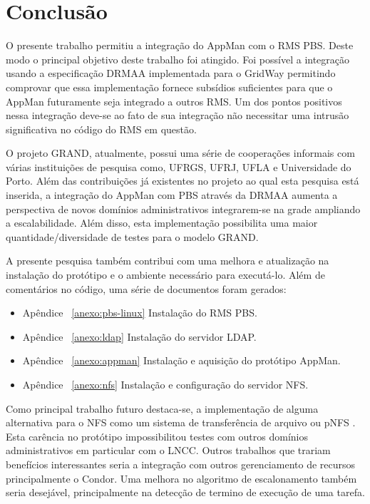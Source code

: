 \chapter{Conclusão}
\label{cap:conclusao}

O presente trabalho permitiu a integração do AppMan com o RMS PBS. Deste modo o principal objetivo deste trabalho foi atingido. Foi possível a integração usando a especificação DRMAA implementada para o GridWay permitindo comprovar que essa implementação fornece subsídios suficientes para que o AppMan futuramente seja integrado a outros RMS. Um dos pontos positivos nessa integração deve-se ao fato de sua integração não necessitar uma intrusão significativa no código do RMS em questão.  

O projeto GRAND, atualmente, possui uma série de cooperações informais com várias instituições de pesquisa como, UFRGS, UFRJ, UFLA e Universidade do Porto. Além das contribuições já existentes no projeto ao qual esta pesquisa está inserida, a integração do AppMan com PBS através da DRMAA aumenta a perspectiva de novos domínios administrativos integrarem-se na grade ampliando a escalabilidade. Além disso, esta implementação possibilita uma maior quantidade/diversidade de testes para o modelo GRAND. 

A presente pesquisa também contribui com uma melhora e atualização na instalação do protótipo e o ambiente necessário para executá-lo. Além de comentários no código, uma série de documentos foram gerados:

\begin{itemize}
	\item Apêndice ~\ref{anexo:pbs-linux} Instalação do RMS PBS.
	\item Apêndice ~\ref{anexo:ldap} Instalação do servidor LDAP.
	\item Apêndice ~\ref{anexo:appman} Instalação e aquisição do protótipo AppMan.
	\item Apêndice ~\ref{anexo:nfs} Instalação e configuração do servidor NFS.
\end{itemize}

Como principal trabalho futuro destaca-se, a implementação de alguma alternativa para o NFS como um sistema de transferência de arquivo ou pNFS \cite{pNFS}. Esta carência no protótipo impossibilitou testes com outros domínios administrativos em particular com o LNCC. Outros trabalhos que trariam benefícios interessantes seria a integração com outros gerenciamento de recursos principalmente o Condor. Uma melhora no algoritmo de escalonamento também seria desejável, principalmente na detecção de termino de execução de uma tarefa.